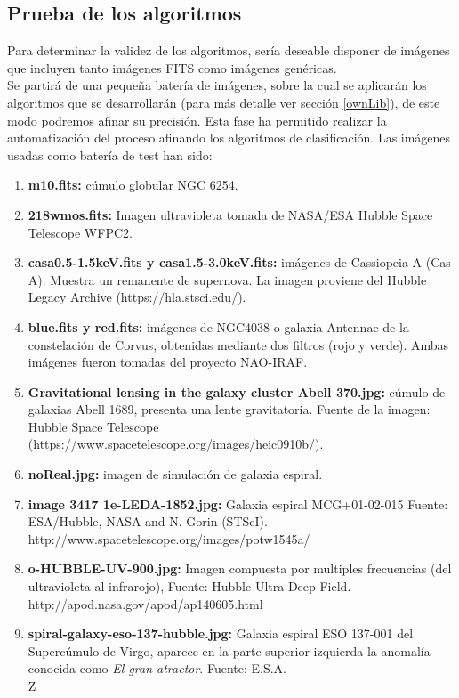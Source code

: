 	\subsection{Prueba de los algoritmos}
	Para determinar la validez de los algoritmos, sería deseable disponer de imágenes que incluyen tanto imágenes FITS como imágenes genéricas.\\
	Se partirá de una pequeña batería de imágenes, sobre la cual se aplicarán los algoritmos que se desarrollarán (para más detalle ver sección \ref{ownLib}), de este modo podremos afinar su precisión.
	Esta fase ha permitido realizar la automatización del proceso afinando los algoritmos de clasificación.
	Las imágenes usadas como batería de test han sido:
	\begin{enumerate}
		\item \textbf{m10.fits:} cúmulo globular NGC 6254.
		\item \textbf{218wmos.fits:} Imagen ultravioleta tomada de NASA/ESA Hubble Space Telescope WFPC2.
		\item \textbf{casa0.5-1.5keV.fits y casa1.5-3.0keV.fits:} imágenes de Cassiopeia A (Cas A). Muestra un remanente de supernova. La imagen proviene del Hubble Legacy Archive (https://hla.stsci.edu/).
		\item \textbf{blue.fits y red.fits:} imágenes de NGC4038 o galaxia Antennae de la constelación de Corvus, obtenidas mediante dos filtros (rojo y verde). Ambas imágenes fueron tomadas del proyecto NAO-IRAF.
		\item \textbf{Gravitational lensing in the galaxy cluster Abell 370.jpg:} cúmulo de galaxias Abell 1689, presenta una lente gravitatoria. Fuente de la imagen: Hubble Space Telescope (https://www.spacetelescope.org/images/heic0910b/).
		\item \textbf{noReal.jpg:} imagen de simulación de galaxia espiral.
		\item \textbf{image 3417 1e-LEDA-1852.jpg:} Galaxia espiral MCG+01-02-015 Fuente: ESA/Hubble, NASA and N. Gorin (STScI). \\http://www.spacetelescope.org/images/potw1545a/
		\item \textbf{o-HUBBLE-UV-900.jpg:} Imagen compuesta por multiples frecuencias (del ultravioleta al infrarojo), Fuente: Hubble Ultra Deep Field.\\ http://apod.nasa.gov/apod/ap140605.html
		\item \textbf{spiral-galaxy-eso-137-hubble.jpg:} Galaxia espiral ESO 137-001 del Supercúmulo de Virgo, aparece en la parte superior izquierda la anomalía conocida como \textit{El gran atractor}. Fuente: E.S.A.\\Z

\end{enumerate}
